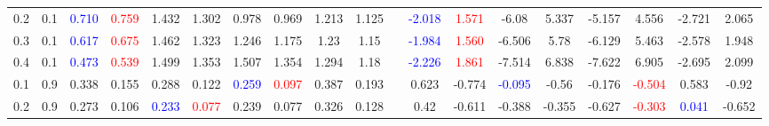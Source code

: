\documentclass[specialist,
substylefile = spbu_report.rtx,
subf,12pt]{disser}
\theoremstyle{definition}
\begin{document}
\begin{table}
{\begin{tabular}{m{1cm}m{1cm}ccccccccm{0.2cm}cccccccc}
			0.2 & 0.1    & \textcolor{blue}{0.710}                      & \textcolor{red}{0.759}                     & 1.432                                         & 1.302                       & 0.978                   & 0.969                                   & 1.213                                      & 1.125                    &                             & \textcolor{blue}{-2.018} & \textcolor{red}{1.571} & -6.08                    & 5.337                  & -5.157   & 4.556                   & -2.721                   & 2.065                   \\
			0.3 & 0.1    & \textcolor{blue}{0.617}                      & \textcolor{red}{0.675}                     & 1.462                                         & 1.323                       & 1.246                   & 1.175                                   & 1.23                                       & 1.15                     &                             & \textcolor{blue}{-1.984} & \textcolor{red}{1.560} & -6.506                   & 5.78                   & -6.129   & 5.463                   & -2.578                   & 1.948                   \\
			0.4 & 0.1    & \textcolor{blue}{0.473}                      & \textcolor{red}{0.539}                     & 1.499                                         & 1.353                       & 1.507                   & 1.354                                   & 1.294                                      & 1.18                     &                             & \textcolor{blue}{-2.226} & \textcolor{red}{1.861} & -7.514                   & 6.838                  & -7.622   & 6.905                   & -2.695                   & 2.099                   \\
			\hline
			0.1 & 0.9    & 0.338                                        & 0.155                                      & 0.288                                         & 0.122                       & \textcolor{blue}{0.259} & \textcolor{red}{0.097}                  & 0.387                                      & 0.193                    &                             & 0.623                    & -0.774                 & \textcolor{blue}{-0.095} & -0.56                  & -0.176   & \textcolor{red}{-0.504} & 0.583                    & -0.92                   \\
			0.2 & 0.9    & 0.273                                        & 0.106                                      & \textcolor{blue}{0.233}                       & \textcolor{red}{0.077}      & 0.239                   & 0.077                                   & 0.326                                      & 0.128                    &                             & 0.42                     & -0.611                 & -0.388                   & -0.355                 & -0.627   & \textcolor{red}{-0.303} & \textcolor{blue}{0.041}  & -0.652                  \\

\end{tabular}}
\end{table}
\end{document}

